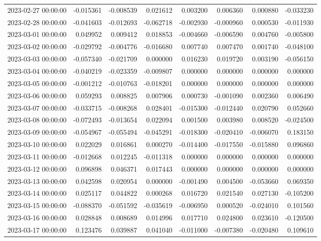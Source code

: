 \begin{tabular}{lrrrrrrr}
2023-02-27 00:00:00 & -0.015361 & -0.008539 & 0.021612 & 0.003200 & 0.006360 & 0.000880 & -0.033230 \\
2023-02-28 00:00:00 & -0.041603 & -0.012693 & -0.062718 & -0.002930 & -0.000960 & 0.000530 & -0.011930 \\
2023-03-01 00:00:00 & 0.049952 & 0.009412 & 0.018853 & -0.004660 & -0.006590 & 0.004760 & -0.005800 \\
2023-03-02 00:00:00 & -0.029792 & -0.004776 & -0.016680 & 0.007740 & 0.007470 & 0.001740 & -0.048100 \\
2023-03-03 00:00:00 & -0.057340 & -0.021709 & 0.000000 & 0.016230 & 0.019720 & 0.003190 & -0.056150 \\
2023-03-04 00:00:00 & -0.040219 & -0.023359 & -0.009807 & 0.000000 & 0.000000 & 0.000000 & 0.000000 \\
2023-03-05 00:00:00 & -0.001212 & -0.010763 & -0.018201 & 0.000000 & 0.000000 & 0.000000 & 0.000000 \\
2023-03-06 00:00:00 & 0.059293 & 0.008825 & 0.007906 & 0.000730 & -0.001090 & 0.002360 & 0.006490 \\
2023-03-07 00:00:00 & -0.033715 & -0.008268 & 0.028401 & -0.015300 & -0.012440 & 0.020790 & 0.052660 \\
2023-03-08 00:00:00 & -0.072493 & -0.013654 & 0.022094 & 0.001500 & 0.003980 & 0.008520 & -0.024500 \\
2023-03-09 00:00:00 & -0.054967 & -0.055494 & -0.045291 & -0.018300 & -0.020410 & -0.006070 & 0.183150 \\
2023-03-10 00:00:00 & 0.022029 & 0.016861 & 0.000270 & -0.014400 & -0.017550 & -0.015880 & 0.096860 \\
2023-03-11 00:00:00 & -0.012668 & 0.012245 & -0.011318 & 0.000000 & 0.000000 & 0.000000 & 0.000000 \\
2023-03-12 00:00:00 & 0.096898 & 0.046371 & 0.017443 & 0.000000 & 0.000000 & 0.000000 & 0.000000 \\
2023-03-13 00:00:00 & 0.042598 & 0.020954 & 0.000000 & -0.001490 & 0.004500 & -0.053660 & 0.069350 \\
2023-03-14 00:00:00 & 0.025117 & 0.044822 & 0.000268 & 0.016720 & 0.021540 & 0.027130 & -0.105200 \\
2023-03-15 00:00:00 & -0.088370 & -0.051592 & -0.035619 & -0.006950 & 0.000520 & -0.024010 & 0.101560 \\
2023-03-16 00:00:00 & 0.028848 & 0.008689 & 0.014996 & 0.017710 & 0.024800 & 0.023610 & -0.120500 \\
2023-03-17 00:00:00 & 0.123476 & 0.039887 & 0.041040 & -0.011000 & -0.007380 & -0.020480 & 0.109610 \\

\end{tabular}
